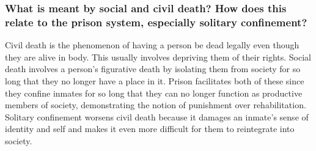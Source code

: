 \documentclass{article}
\begin{document}
\subsubsection*{What is meant by social and civil death? How does this relate
to the prison system, especially solitary confinement?}
Civil death is the phenomenon of having a person be dead legally even though
they are alive in body. This usually involves depriving them of their rights.
Social death involves a person's figurative death by isolating them from society
for so long that they no longer have a place in it. Prison facilitates both of
these since they confine inmates for so long that they can no longer function
as productive members of society, demonstrating the notion of punishment over
rehabilitation. Solitary confinement worsens civil death because it damages an
inmate's sense of identity and self and makes it even more difficult for them
to reintegrate into society.
\end{document}
